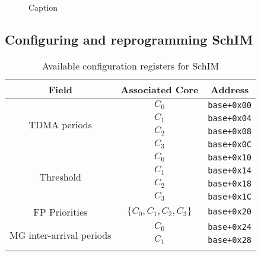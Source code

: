 \begin{figure}
  \centering
  
  \caption{Caption}
  \label{fig:SchIM_transaction_scheme_figure}
\end{figure}

\subsection{Configuring and reprogramming SchIM}
\begin{table}[!ht]
  \centering
  \caption{Available configuration registers for SchIM}
  \label{tab:configuration_port_structure}
  \begin{tabular}{|c||c|c|}
    \hline
    \multicolumn{1}{|c||}{Field}               & \multicolumn{1}{c|}{Associated Core}      & \multicolumn{1}{c|}{Address}        \\ \hline\hline
    \multirow{4}{*}{TDMA periods}             & $C_{0}$                                   & \verb|base+0x00|                    \\ \cline{2-3} 
    & $C_{1}$                                   & \verb|base+0x04|                    \\ \cline{2-3} 
    & $C_{2}$                                   & \verb|base+0x08|                    \\ \cline{2-3} 
    & $C_{3}$                                   & \verb|base+0x0C|                    \\ \hline
    \multirow{4}{*}{Threshold}                & $C_{0}$                                   & \verb|base+0x10|                    \\ \cline{2-3} 
    & $C_{1}$                                   & \verb|base+0x14|                    \\ \cline{2-3} 
    & $C_{2}$                                   & \verb|base+0x18|                    \\ \cline{2-3} 
    & $C_{3}$                                   & \verb|base+0x1C|                    \\ \hline
    FP Priorities                                & $\{C_{0}, C_{1}, C_{2}, C_{3}\}$          & \verb|base+0x20|                    \\ \hline
    \multirow{4}{*}{MG inter-arrival periods} & $C_{0}$                                   & \verb|base+0x24|                    \\ \cline{2-3} 
    & $C_{1}$                                   & \verb|base+0x28|                    \\ \cline{2-3} 

\end{tabular}
\end{table}
